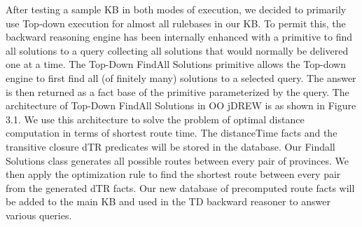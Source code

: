 \hspace{0.3in} After testing a sample KB in both modes of execution, we decided to primarily use Top-down execution for almost all rulebases in our KB. To permit this, the backward reasoning engine has been internally enhanced with a primitive to find all solutions to a query collecting all solutions that would normally be delivered one at a time. The Top-Down FindAll Solutions primitive allows the Top-down engine to first find all (of finitely many) solutions to a selected query. The answer is then returned as a fact base of the primitive parameterized by the query. The architecture of Top-Down FindAll Solutions in OO jDREW is as shown in Figure 3.1. We use this architecture to solve the problem of optimal distance computation in terms of shortest route time. The distanceTime facts and the transitive closure dTR predicates will be stored in the database. Our Findall Solutions class generates all possible routes between every pair of provinces. We then apply the optimization rule to find the shortest route between every pair from the generated dTR facts. Our new database of precomputed route facts will be added to the main KB and used in the TD backward reasoner to answer various queries.




